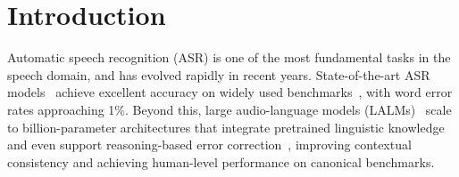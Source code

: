 \documentclass{llmxive}
\begin{document}

%         

%         





\section{Introduction}
\vspace{-1mm}
Automatic speech recognition (ASR) is one of the most fundamental tasks in the speech domain, and has evolved rapidly in recent years. State-of-the-art ASR models~\citep{qwen3-asr,fireredasr2s,paraformer} achieve excellent accuracy on widely used benchmarks~\citep{librispeech}, with word error rates approaching 1\%. Beyond this, large audio-language models (LALMs)~\citep{qwen3-omni,Kimi-Audio} scale to billion-parameter architectures that integrate pretrained linguistic knowledge and even support reasoning-based error correction~\citep{reasoningforasr}, improving contextual consistency and achieving human-level performance on canonical benchmarks.
\vspace{-0.5mm}
\end{document}
